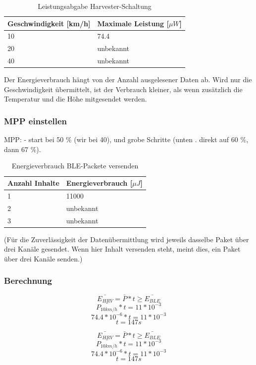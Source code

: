 \begin{table}[ht]
\begin{tabular}{|l|l|}\hline \label{MPP_Werte} 
    Geschwindigkeit [km/h] & Maximale Leistung [$\mu W$] \\ \hline
    10 & 74.4 \\ \hline
    20 & unbekannt \\ \hline
    40 & unbekannt \\ \hline
\end{tabular}
\caption{Leistungsabgabe Harvester-Schaltung}
\end{table}


Der Energieverbrauch hängt von der Anzahl ausgelesener Daten ab. Wird nur die Geschwindigkeit übermittelt, ist der Verbrauch kleiner, als wenn zusätzlich die Temperatur und die Höhe mitgesendet werden.


\subsubsection{MPP einstellen}

MPP:
- start bei 50 \% (wir bei 40), und grobe Schritte (unten . direkt auf 60 \%, dann 67 \%). 

 
\begin{table}[ht]
\begin{tabular}{|l|l|}\hline \label{Energie_Pakete_Werte} 
    Anzahl Inhalte  & Energieverbrauch [$\mu J$] \\ \hline
    1 & 11000 \\ \hline
    2 & unbekannt \\ \hline
    3 & unbekannt \\ \hline
\end{tabular}
\caption{Energieverbrauch BLE-Packete versenden}
\end{table}

(Für die Zuverlässigkeit der Datenübermittlung wird jeweils dasselbe Paket über drei Kanäle gesendet. Wenn hier  Inhalt versenden \grqq  steht, meint dies, ein Paket über drei Kanäle senden.)

\subsubsection*{Berechnung}

\[\bar{E_{HRV}} = \bar{P} * t \ge \bar{E_{BLE}}  \]
\[\bar{P_{10km/h}} * t = 11 * 10^{-3}  \]
\[74.4 * 10^{-6} * t = 11 * 10^{-3}   \]
\[t = 147 s  \]

\[\bar{E_{HRV}} = \bar{P} * t \ge \bar{E_{BLE}}  \]
\[\bar{P_{10km/h}} * t = 11 * 10^{-3}  \]
\[74.4 * 10^{-6} * t = 11 * 10^{-3}   \]
\[t = 147 s  \]

